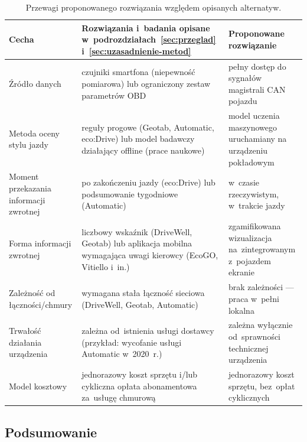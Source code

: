 \begin{table}[!h]
    \centering
    \caption{Przewagi proponowanego rozwiązania względem opisanych alternatyw.}
    \label{tab:przewagi}
    \begin{tabular}{| p{3.4cm} | p{5.8cm} | p{5.3cm} |} \hline
        \textbf{Cecha} & \textbf{Rozwiązania i~badania opisane w~podrozdziałach~\ref{sec:przeglad} i~\ref{sec:uzasadnienie-metod}} & \textbf{Proponowane rozwiązanie} \\ \hline\hline
        Źródło danych & czujniki smartfona (niepewność pomiarowa) lub ograniczony zestaw parametrów OBD & pełny dostęp do sygnałów magistrali CAN pojazdu \\ \hline
        Metoda oceny stylu jazdy & reguły progowe (Geotab, Automatic, eco:Drive) lub model badawczy działający offline (prace naukowe) & model uczenia maszynowego uruchamiany na urządzeniu pokładowym \\ \hline
        Moment przekazania informacji zwrotnej & po zakończeniu jazdy (eco:Drive) lub podsumowanie tygodniowe (Automatic) & w~czasie rzeczywistym, w~trakcie jazdy \\ \hline
        Forma informacji zwrotnej & liczbowy wskaźnik (DriveWell, Geotab) lub aplikacja mobilna wymagająca uwagi kierowcy (EcoGO, Vitiello i~in.) & zgamifikowana wizualizacja na~zintegrowanym z~pojazdem ekranie \\ \hline
        Zależność od łączności/chmury & wymagana stała łączność sieciowa (DriveWell, Geotab, Automatic) & brak zależności --- praca w~pełni lokalna \\ \hline
        Trwałość działania urządzenia & zależna od~istnienia usługi dostawcy (przykład: wycofanie usługi Automatic w~2020~r.) & zależna wyłącznie od~sprawności technicznej urządzenia \\ \hline
        Model kosztowy & jednorazowy koszt sprzętu i/lub cykliczna opłata abonamentowa za~usługę chmurową & jednorazowy koszt sprzętu, bez~opłat cyklicznych \\ \hline
    \end{tabular}
\end{table}

\subsection{Podsumowanie}

